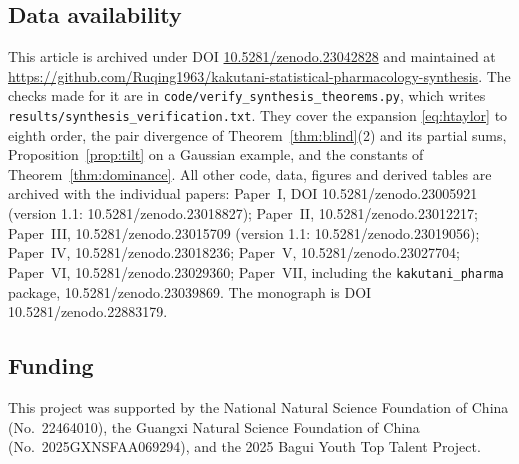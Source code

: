 \documentclass[11pt,reqno]{amsart}
\theoremstyle{plain}
\theoremstyle{definition}
\theoremstyle{remark}
\numberwithin{equation}{section}
\begin{document}
\subsection*{Data availability}
{\raggedright
This article is archived under DOI \href{https://doi.org/10.5281/zenodo.23042828}{10.5281/zenodo.23042828} and maintained at \url{https://github.com/Ruqing1963/kakutani-statistical-pharmacology-synthesis}. The checks made for it are in \texttt{code/verify\_synthesis\_theorems.py}, which writes \texttt{results/synthesis\_verification.txt}. They cover the expansion \eqref{eq:htaylor} to eighth order, the pair divergence of Theorem~\ref{thm:blind}(2) and its partial sums, Proposition~\ref{prop:tilt} on a Gaussian example, and the constants of Theorem~\ref{thm:dominance}. All other code, data, figures and derived tables are archived with the individual papers: Paper~I, DOI 10.5281/zenodo.23005921 (version 1.1: 10.5281/zenodo.23018827); Paper~II, 10.5281/zenodo.23012217; Paper~III, 10.5281/zenodo.23015709 (version 1.1: 10.5281/zenodo.23019056); Paper~IV, 10.5281/zenodo.23018236; Paper~V, 10.5281/zenodo.23027704; Paper~VI, 10.5281/zenodo.23029360; Paper~VII, including the \texttt{kakutani\_pharma} package, 10.5281/zenodo.23039869. The monograph is DOI 10.5281/zenodo.22883179.
\par}

\subsection*{Funding}
This project was supported by the National Natural Science Foundation of China (No.~22464010), the Guangxi Natural Science Foundation of China (No.~2025GXNSFAA069294), and the 2025 Bagui Youth Top Talent Project.
\end{document}

